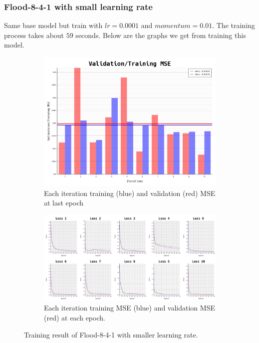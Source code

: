 \documentclass{article}
\begin{document}
\newpage
\subsubsection*{Flood-8-4-1 with small learning rate}
Same base model but train with $lr = 0.0001$ and $momentum = 0.01$.
The training process takes about $59$ seconds.
Below are the graphs we get from training this model. 
\begin{figure}[ht]
	\begin{subfigure}{\textwidth}
		\centering
		\includegraphics[scale=0.3]{flood-8-4-1_3/cv_l}
		\caption{Each iteration training (blue) and validation (red) MSE at last epoch}
		\label{fig:4a}
	\end{subfigure}
	\begin{subfigure}{\textwidth}
		\includegraphics[width=\textwidth]{flood-8-4-1_3/loss}
		\caption{Each iteration training MSE (blue) and validation MSE (red) at each epoch.}
		\label{fig:4b}
	\end{subfigure}
	\caption{Training result of Flood-8-4-1 with smaller learning rate.}
	\label{fig:4}
\end{figure}
\FloatBarrier
\end{document}
